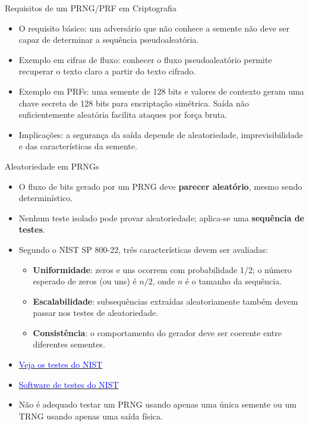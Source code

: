 \begin{frame}{Requisitos de um PRNG/PRF em Criptografia}
    \begin{itemize}
        \item O requisito básico: um adversário que não conhece a semente não deve ser capaz de determinar a sequência pseudoaleatória.
        \item Exemplo em cifras de fluxo: conhecer o fluxo pseudoaleatório permite recuperar o texto claro a partir do texto cifrado.
        \item Exemplo em PRFs: uma semente de 128 bits e valores de contexto geram uma chave secreta de 128 bits para encriptação simétrica. Saída não suficientemente aleatória facilita ataques por força bruta.
        \item Implicações: a segurança da saída depende de aleatoriedade, imprevisibilidade e das características da semente.
    \end{itemize}
\end{frame}

\begin{frame}{Aleatoriedade em PRNGs}
    \begin{itemize}
        \item O fluxo de bits gerado por um PRNG deve \textbf{parecer aleatório}, mesmo sendo determinístico.
        \item Nenhum teste isolado pode provar aleatoriedade; aplica-se uma \textbf{sequência de testes}.
        \item Segundo o NIST SP 800-22, três características devem ser avaliadas:
              \begin{itemize}
                  \item \textbf{Uniformidade}: zeros e uns ocorrem com probabilidade 1/2; o número esperado de zeros (ou uns) é $n/2$, onde $n$ é o tamanho da sequência.
                  \item \textbf{Escalabilidade}: subsequências extraídas aleatoriamente também devem passar nos testes de aleatoriedade.
                  \item \textbf{Consistência}: o comportamento do gerador deve ser coerente entre diferentes sementes.
              \end{itemize}
        \item \href{https://csrc.nist.gov/pubs/sp/800/22/r1/upd1/final}{\textcolor{blue}{Veja os testes do NIST}}

        \item \href{https://csrc.nist.gov/projects/random-bit-generation/documentation-and-software}{\textcolor{blue}{Software de testes do NIST}}
        \item Não é adequado testar um PRNG usando apenas uma única semente ou um TRNG usando apenas uma saída física.
    \end{itemize}
\end{frame}

